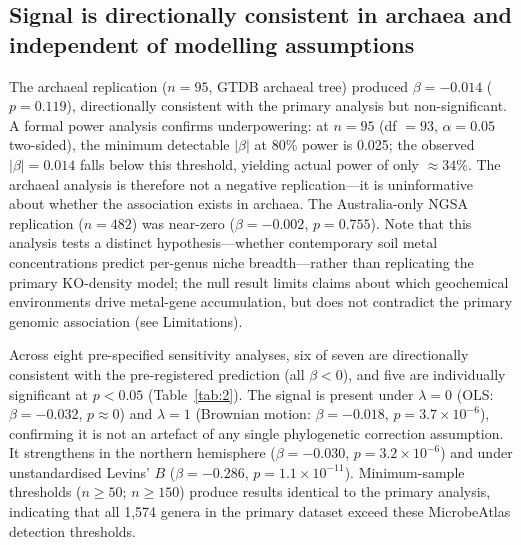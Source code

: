 \documentclass[times]{zHenriquesLab-StyleBioRxiv}
\begin{document}
\subsection{Signal is directionally consistent in archaea and independent of
modelling assumptions}
\label{ss:archaea}

The archaeal replication ($n = 95$, GTDB archaeal tree) produced
$\beta = -0.014$ ($p = 0.119$), directionally consistent with the primary
analysis but non-significant. A formal power analysis confirms underpowering:
at $n = 95$ (df $= 93$, $\alpha = 0.05$ two-sided), the minimum detectable
$|\beta|$ at 80\% power is 0.025; the observed $|\beta| = 0.014$ falls below
this threshold, yielding actual power of only ${\approx}34\%$. The archaeal
analysis is therefore not a negative replication---it is uninformative about
whether the association exists in archaea. The Australia-only NGSA replication ($n = 482$)
was near-zero ($\beta = -0.002$, $p = 0.755$). Note that this analysis tests a
distinct hypothesis---whether contemporary soil metal concentrations predict
per-genus niche breadth---rather than replicating the primary KO-density model;
the null result limits claims about which geochemical environments drive metal-gene
accumulation, but does not contradict the primary genomic association (see
Limitations).

Across eight pre-specified sensitivity analyses, six of seven are directionally
consistent with the pre-registered prediction (all $\beta < 0$), and five are individually significant at
$p < 0.05$ (Table~\ref{tab:2}). The signal is present under $\lambda = 0$
(OLS: $\beta = -0.032$, $p \approx 0$) and $\lambda = 1$ (Brownian motion:
$\beta = -0.018$, $p = 3.7 \times 10^{-6}$), confirming it is not an artefact
of any single phylogenetic correction assumption. It strengthens in the
northern hemisphere ($\beta = -0.030$, $p = 3.2 \times 10^{-6}$) and
under unstandardised Levins' $B$ ($\beta = -0.286$,
$p = 1.1 \times 10^{-11}$). Minimum-sample thresholds ($n \geq 50$;
$n \geq 150$) produce results identical to the primary analysis, indicating
that all 1,574 genera in the primary dataset exceed these MicrobeAtlas
detection thresholds.
\end{document}
